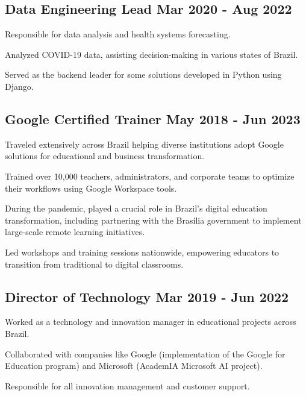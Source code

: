\documentclass[letter,10pt]{article}
\begin{document}
\subsection{{Data Engineering Lead \hfill Mar 2020 - Aug 2022}}
\begin{zitemize}
\item Responsible for data analysis and health systems forecasting.
\item Analyzed COVID-19 data, assisting decision-making in various states of Brazil.
\item Served as the backend leader for some solutions developed in Python using Django.
\end{zitemize}


\subsection{{Google Certified Trainer \hfill May 2018 - Jun 2023}}
\begin{zitemize}
\item Traveled extensively across Brazil helping diverse institutions adopt Google solutions for educational and business transformation.
\item Trained over 10,000 teachers, administrators, and corporate teams to optimize their workflows using Google Workspace tools.
\item During the pandemic, played a crucial role in Brazil's digital education transformation, including partnering with the Brasília government to implement large-scale remote learning initiatives.
\item Led workshops and training sessions nationwide, empowering educators to transition from traditional to digital classrooms.
\end{zitemize}

\newpage

\subsection{{Director of Technology \hfill Mar 2019 - Jun 2022}}
\begin{zitemize}
\item Worked as a technology and innovation manager in educational projects across Brazil.
\item Collaborated with companies like Google (implementation of the Google for Education program) and Microsoft (AcademIA Microsoft AI project).
\item Responsible for all innovation management and customer support.
\end{zitemize}
\end{document}
